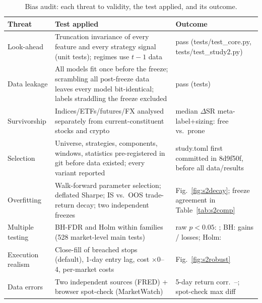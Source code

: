 \begin{table}[!t]
\centering
\caption{Bias audit: each threat to validity, the test applied, and its outcome.}
\label{tab:s2bias}
\footnotesize
\begin{tabular}{p{2.0cm} p{8.2cm} p{6.5cm}}
\toprule
Threat & Test applied & Outcome \\
\midrule
Look-ahead & Truncation invariance of every feature and every strategy signal (unit tests); regimes use $t-1$ data & pass (tests/test\_core.py, tests/test\_study2.py) \\
Data leakage & All models fit once before the freeze; scrambling all post-freeze data leaves every model bit-identical; labels straddling the freeze excluded & pass (tests) \\
Survivorship & Indices/ETFs/futures/FX analysed separately from current-constituent stocks and crypto & median $\Delta$SR meta-label+sizing: free \STwoSurvBestFree{} vs.\ prone \STwoSurvBestProne{} \\
Selection & Universe, strategies, components, windows, statistics pre-registered in git before data existed; every variant reported & study.toml first committed in 8d9f50f, before all data/results \\
Overfitting & Walk-forward parameter selection; deflated Sharpe; IS vs.\ OOS trade-return decay; two independent freezes & Fig.~\ref{fig:s2decay}; freeze agreement in Table~\ref{tab:s2comp} \\
Multiple testing & BH-FDR and Holm within families (528 market-level main tests) & raw $p<0.05$: \STwoMktRawSig{}; BH: \STwoMktSigGain{} gains / \STwoMktSigLoss{} losses; Holm: \STwoMktHolmSig{} \\
Execution realism & Close-fill of breached stops (default), 1-day entry lag, cost $\times$0--4, per-market costs & Fig.~\ref{fig:s2robust} \\
Data errors & Two independent sources (FRED) + browser spot-check (MarketWatch) & 5-day return corr.\ \STwoFredCorrFiveMin{}--\STwoFredCorrFiveMax{}; spot-check max diff \STwoSpotMaxDiff{} \\
\bottomrule
\end{tabular}
\end{table}
